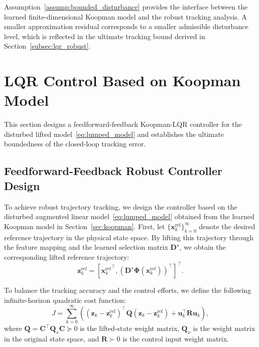 \documentclass[final,3p,twocolumn,times]{elsarticle}
\newcommand{\x}{\mathbf{x}}
\newcommand{\uvec}{\mathbf{u}}
\newcommand{\z}{\mathbf{z}}
\newcommand{\Dmat}{\mathbf{D}}
\newcommand{\C}{\mathbf{C}}
\newcommand{\Q}{\mathbf{Q}}
\newcommand{\Rmat}{\mathbf{R}}
\newcommand{\Phib}{\boldsymbol{\Phi}}
\begin{document}
Assumption~\ref{assump:bounded_disturbance} provides the interface between the learned finite-dimensional Koopman model and the robust tracking analysis. A smaller approximation residual corresponds to a smaller admissible disturbance level, which is reflected in the ultimate tracking bound derived in Section~\ref{subsec:lqr_robust}.


\section{LQR Control Based on Koopman Model}
\label{sec:lqr}

This section designs a feedforward-feedback Koopman-LQR controller for the disturbed lifted model~\eqref{eq:lumped_model} and establishes the ultimate boundedness of the closed-loop tracking error.

\subsection{Feedforward-Feedback Robust Controller Design}
\label{subsec:lqr_design}

To achieve robust trajectory tracking, we design the controller based on the disturbed augmented linear model~\eqref{eq:lumped_model} obtained from the learned Koopman model in Section~\ref{sec:koopman}.
First, let $\{\x_k^{\text{ref}}\}_{k=0}^{\infty}$ denote the desired reference trajectory in the physical state space. By lifting this trajectory through the feature mapping and the learned selection matrix $\Dmat^\star$, we obtain the corresponding lifted reference trajectory: 
\begin{equation}
\z_k^{\text{ref}} = [{\x_k^{\text{ref}}}^\top, {(\Dmat^\star\Phib(\x_k^{\text{ref}}))}^\top]^\top.
\end{equation}

To balance the tracking accuracy and the control efforts, we define the following infinite-horizon quadratic cost function:
\begin{equation}
\label{eq:lqr_cost}
J = \sum_{k=0}^{\infty} \left( (\z_k - \z_k^{\text{ref}})^\top \Q (\z_k - \z_k^{\text{ref}}) + \uvec_k^\top \Rmat \uvec_k \right),
\end{equation}
where $\Q = \C^\top \Q_x \C \succeq 0$ is the lifted-state weight matrix, $\Q_x$ is the weight matrix in the original state space, and $\Rmat \succ 0$ is the control input weight matrix.
\end{document}
